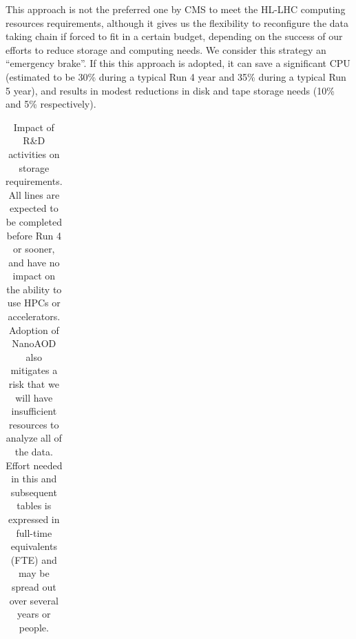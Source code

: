 \documentclass{cmspaper}
\begin{document}
This approach is not the preferred one by CMS to meet the HL-LHC computing resources requirements, although it gives us the flexibility to reconfigure the data taking chain if forced to fit in a certain budget, depending on the success of our efforts to reduce storage and computing needs. We consider this strategy an ``emergency brake''. If this this approach is adopted, it can save a significant CPU (estimated to be 30\% during a typical Run 4 year and 35\% during a typical Run 5 year), and results in modest reductions in disk and tape storage needs (10\% and 5\% respectively).

\begin{table}[ht]
{\footnotesize
\begin{center}
\caption{Impact of R\&D activities on storage requirements. All lines are expected to be completed before Run 4 or sooner, and have no impact on the ability to use HPCs or accelerators. Adoption of NanoAOD also mitigates a risk that we will have insufficient resources to analyze all of the data. Effort needed in this and subsequent tables is expressed in full-time equivalents (FTE) and may be spread out over several years or people.}
\label{tab:storage_needs}
\begin{tabular}{llllll} 
\hline


\end{tabular}
\end{center}}
\end{table}
\end{document}
